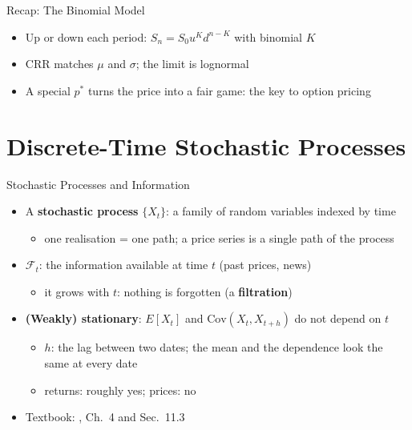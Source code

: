 \begin{frame}{Recap: The Binomial Model}
\itemsize{\small}
\begin{itemize}
    \item Up or down each period: $S_n = S_0 u^K d^{n-K}$ with binomial $K$
    \item CRR matches $\mu$ and $\sigma$; the limit is lognormal
    \item A special $p^*$ turns the price into a fair game: the key to option pricing
\end{itemize}
\end{frame}


\section{Discrete-Time Stochastic Processes}

\begin{frame}{Stochastic Processes and Information}
\itemsize{\small}
\begin{itemize}
    \item A \textbf{stochastic process} $\{X_t\}$: a family of random variables indexed by time
    \begin{itemize}
        \item one realisation = one path; a price series is a single path of the process
    \end{itemize}
    \item $\mathcal{F}_t$: the information available at time $t$ (past prices, news)
    \begin{itemize}
        \item it grows with $t$: nothing is forgotten (a \textbf{filtration})
    \end{itemize}
    \item \textbf{(Weakly) stationary}: $E[X_t]$ and $\text{Cov}(X_t, X_{t+h})$ do not depend on $t$
    \begin{itemize}
        \item $h$: the lag between two dates; the mean and the dependence look the same at every date
        \item returns: roughly yes; prices: no
    \end{itemize}
    \item Textbook: , Ch.~4 and Sec.~11.3
\end{itemize}
\end{frame}

